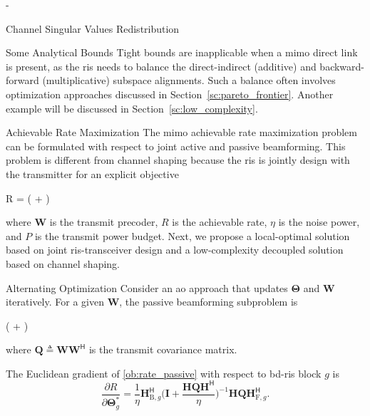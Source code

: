 \begin{section}{-}
\begin{subsection}{Channel Singular Values Redistribution}
\begin{subsubsection}{Some Analytical Bounds}
			Tight bounds are inapplicable when a \gls{mimo} direct link is present, as the \gls{ris} needs to balance the direct-indirect (additive) and backward-forward (multiplicative) subspace alignments.
			Such a balance often involves optimization approaches discussed in Section~\ref{sc:pareto_frontier}. Another example will be discussed in Section~\ref{sc:low_complexity}.
		\end{subsubsection}

	\end{subsection}

	\begin{subsection}{Achievable Rate Maximization}\label{sc:rate}
		The \gls{mimo} achievable rate maximization problem can be formulated with respect to joint active and passive beamforming.
		This problem is different from channel shaping because the \gls{ris} is jointly design with the transmitter for an explicit objective
		\begin{maxi!}
			{}{R = \log \det \biggl( + \biggr)}{\label{op:rate}}{\label{ob:rate}}
		\end{maxi!}
		where $\mathbf{W}$ is the transmit precoder, $R$ is the achievable rate, $\eta$ is the noise power, and $P$ is the transmit power budget.
		Next, we propose a local-optimal solution based on joint \gls{ris}-transceiver design and a low-complexity decoupled solution based on channel shaping.

		\begin{subsubsection}{Alternating Optimization}
			Consider an \gls{ao} approach that updates $\mathbf{\Theta}$ and $\mathbf{W}$ iteratively.
			For a given $\mathbf{W}$, the passive beamforming subproblem is
			\begin{maxi!}
				{\scriptstyle{\mathbf{\Theta}}}{\log \det \biggl( + \biggr)}{\label{op:rate_passive}}{\label{ob:rate_passive}}
				\addConstraint{\mathbf{\Theta}_g^\mathsf{H} \mathbf{\Theta}_g=\mathbf{I}, \quad \forall g,}{}{}
			\end{maxi!}
			where $\mathbf{Q} \triangleq \mathbf{W} \mathbf{W}^\mathsf{H}$ is the transmit covariance matrix.
			\begin{lemma}\label{lm:rate_gradient}
				The Euclidean gradient of \eqref{ob:rate_passive} with respect to \gls{bd}-\gls{ris} block $g$ is
				\begin{equation}
					\frac{\partial R}{\partial \mathbf{\Theta}_g^*} = \frac{1}{\eta} \mathbf{H}_{\mathrm{B},g}^\mathsf{H} \biggl(\mathbf{I} + \frac{\mathbf{H}\mathbf{Q}\mathbf{H}^\mathsf{H}}{\eta}\biggr)^{-1} \mathbf{H} \mathbf{Q} \mathbf{H}_{\mathrm{F},g}^\mathsf{H}.
					\label{eq:rate_gradient}
				\end{equation}
			\end{lemma}


\end{subsubsection}
\end{subsection}
\end{section}
